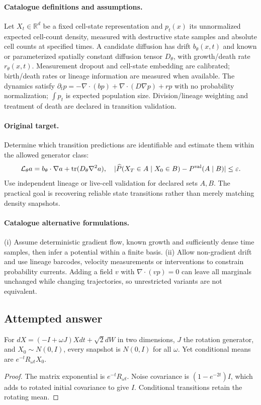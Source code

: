 \documentclass[11pt]{article}
\begin{document}
\paragraph{Catalogue definitions and assumptions.}
Let $X_t\in\mathbb{R}^d$ be a fixed cell-state representation and $p_t(x)$ its unnormalized expected cell-count density, measured with destructive state samples and absolute cell counts at specified times. A candidate diffusion has drift $b_\theta(x,t)$ and known or parameterized spatially constant diffusion tensor $D_\theta$, with growth/death rate $r_\theta(x,t)$. Measurement dropout and cell-state embedding are calibrated; birth/death rates or lineage information are measured when available. The dynamics satisfy $\partial_t p=-\nabla\cdot(bp)+\nabla\cdot(D\nabla p)+rp$ with no probability normalization; $\int p_t$ is expected population size. Division/lineage weighting and treatment of death are declared in transition validation.
\paragraph{Original target.}
Determine which transition predictions are identifiable and estimate them within the allowed generator class:
\[
\mathcal L_\theta a=b_\theta\cdot\nabla a+\operatorname{tr}(D_\theta\nabla^2a),
\quad |\widehat P(X_T\in A\mid X_0\in B)-P^{\rm val}(A\mid B)|\leq\varepsilon.
\]
Use independent lineage or live-cell validation for declared sets $A,B$. The practical goal is recovering reliable state transitions rather than merely matching density snapshots.
\paragraph{Catalogue alternative formulations.}
(i) Assume deterministic gradient flow, known growth and sufficiently dense time samples, then infer a potential within a finite basis. (ii) Allow non-gradient drift and use lineage barcodes, velocity measurements or interventions to constrain probability currents. Adding a field $v$ with $\nabla\cdot(vp)=0$ can leave all marginals unchanged while changing trajectories, so unrestricted variants are not equivalent.
\subsection{Attempted answer}
\begin{proposition}
For $dX=(-I+\omega J)Xdt+\sqrt2dW$ in two dimensions, $J$ the rotation generator, and $X_0\sim N(0,I)$, every snapshot is $N(0,I)$ for all $\omega$. Yet conditional means are $e^{-t}R_{\omega t}X_0$.
\end{proposition}
\begin{proof}
The matrix exponential is $e^{-t}R_{\omega t}$. Noise covariance is $(1-e^{-2t})I$, which adds to rotated initial covariance to give $I$. Conditional transitions retain the rotating mean.
\end{proof}
\end{document}
